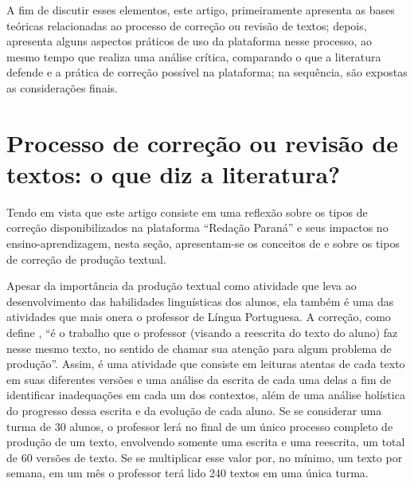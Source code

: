 \documentclass[portuguese]{textolivre}
\begin{document}
A fim de discutir esses elementos, este artigo, primeiramente apresenta as bases teóricas relacionadas ao processo de correção ou revisão de textos; depois, apresenta alguns aspectos práticos de uso da plataforma nesse processo, ao mesmo tempo que realiza uma análise crítica, comparando o que a literatura defende e a prática de correção possível na plataforma; na sequência, são expostas as considerações finais.

\section{Processo de correção ou revisão de textos: o que diz a literatura?}
Tendo em vista que este artigo consiste em uma reflexão sobre os tipos de correção disponibilizados na plataforma ``Redação Paraná'' e seus impactos no ensino-aprendizagem, nesta seção, apresentam-se os conceitos de \textcite{ruiz2015} e \textcite{conceicao2004} sobre os tipos de correção de produção textual. 

Apesar da importância da produção textual como atividade que leva ao desenvolvimento das habilidades linguísticas dos alunos, ela também é uma das atividades que mais onera o professor de Língua Portuguesa. A correção, como define \textcite[p. 19]{ruiz2015}, ``é o trabalho que o professor (visando a reescrita do texto do aluno) faz nesse mesmo texto, no sentido de chamar sua atenção para algum problema de produção''. Assim, é uma atividade que consiste em leituras atentas de cada texto em suas diferentes versões e uma análise da escrita de cada uma delas a fim de identificar inadequações em cada um dos contextos, além de uma análise holística do progresso dessa escrita e da evolução de cada aluno. Se se considerar uma turma de 30 alunos, o professor lerá no final de um único processo completo de produção de um texto, envolvendo somente uma escrita e uma reescrita, um total de 60 versões de texto. Se se multiplicar esse valor por, no mínimo, um texto por semana, em um mês o professor terá lido 240 textos em uma única turma.
\end{document}

